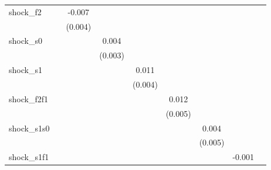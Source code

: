 {\begin{tabular}{l*{8}{c}}
\addlinespace
shock\_f2    &                     &      -0.007         &                     &                     &                     &                     &                     &                     \\
            &                     &     (0.004)         &                     &                     &                     &                     &                     &                     \\
\addlinespace
shock\_s0    &                     &                     &       0.004         &                     &                     &                     &                     &                     \\
            &                     &                     &     (0.003)         &                     &                     &                     &                     &                     \\
\addlinespace
shock\_s1    &                     &                     &                     &       0.011\sym{**} &                     &                     &                     &                     \\
            &                     &                     &                     &     (0.004)         &                     &                     &                     &                     \\
\addlinespace
shock\_f2f1  &                     &                     &                     &                     &       0.012\sym{**} &                     &                     &                     \\
            &                     &                     &                     &                     &     (0.005)         &                     &                     &                     \\
\addlinespace
shock\_s1s0  &                     &                     &                     &                     &                     &       0.004         &                     &                     \\
            &                     &                     &                     &                     &                     &     (0.005)         &                     &                     \\
\addlinespace
shock\_s1f1  &                     &                     &                     &                     &                     &                     &      -0.001         &                     \\

\end{tabular}}
